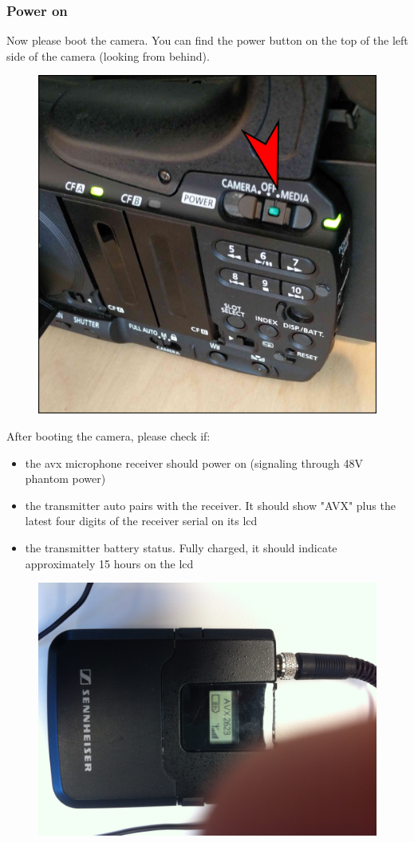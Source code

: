 \documentclass{article}
\begin{document}
\subsubsection{Power on}
Now please boot the camera. You can find the power button on the top of the left side of the camera (looking from behind).

\begin{figure}[H]
  \centering
\includegraphics[width = 120mm]{Canon03.jpg}
\end{figure}

After booting the camera, please check if:
\begin{itemize}
  \item the avx microphone receiver should power on (signaling through 48V phantom power)
  \item the transmitter auto pairs with the receiver. It should show "AVX" plus the latest four digits of the receiver serial on its lcd
  \item the transmitter battery status. Fully charged, it should indicate approximately 15 hours on the lcd
\end{itemize}

\begin{figure}[H]
  \centering
\includegraphics[width = 120mm]{paired_avx.jpg}
\end{figure}
\end{document}
